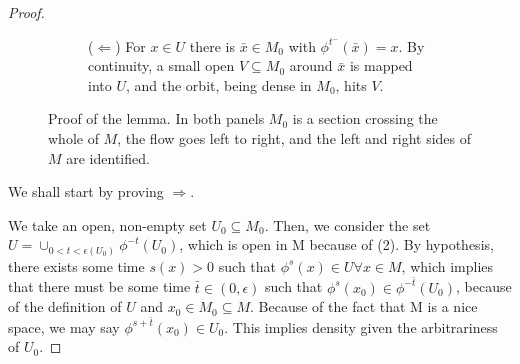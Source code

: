 \begin{proof}
\begin{figure}[ht]
\begin{subfigure}[t]{\textwidth}
            \caption{($\Leftarrow$) For $x\in U$ there is $\bar{x}\in M_0$ with $\phi^{t^-}(\bar{x})=x$. By
            continuity, a small open $V\subseteq M_0$ around $\bar{x}$ is mapped into $U$, and the orbit,
            being dense in $M_0$, hits $V$.}
            \label{fig:poincare_lemma_b}
        \end{subfigure}

        \caption{Proof of the lemma. In both panels $M_0$ is a section crossing the whole of $M$, the
        flow goes left to right, and the left and right sides of $M$ are identified.}
        \label{fig:poincare_lemma}
    \end{figure}

    We shall start by proving $\Rightarrow$. 

    We take an open, non-empty set $U_0\subseteq M_0$. Then, we consider the set $U=\cup_{0<t<\epsilon(U_0)}\phi^{-t}(U_0)$, which is open in M because of (2). By hypothesis, there exists some time $s(x)>0$ such that $\phi^s(x)\in U\forall x\in M$, which implies that there must be some time $\bar{t}\in(0,\epsilon)$ such that $\phi^s (x_0)\in\phi^{-\bar{t}}(U_0)$, because of the definition of $U$ and $x_0\in M_0\subseteq M$. Because of the fact that M is a nice space, we may say $\phi^{s+\bar{t}}(x_0)\in U_0$. This implies density given the arbitrariness of $U_0$.


\end{proof}
